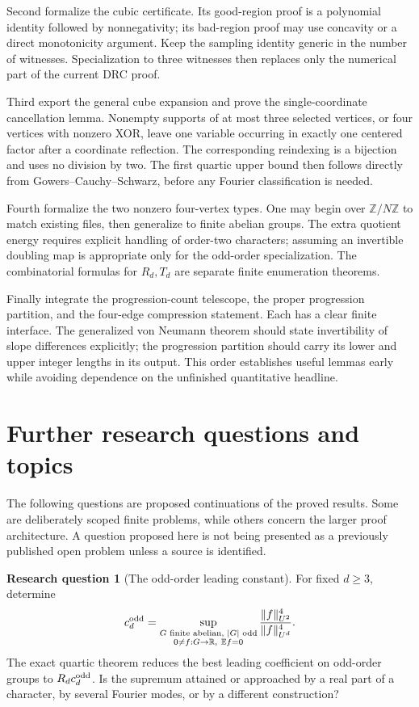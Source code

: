 \documentclass[11pt,letterpaper]{article}
\numberwithin{equation}{section}
\theoremstyle{definition}
\newtheorem{problem}[theorem]{Research question}
\theoremstyle{remark}
\newcommand{\E}{\mathbb E}
\newcommand{\R}{\mathbb R}
\newcommand{\Z}{\mathbb Z}
\newcommand{\1}{\mathbf 1}
\newcommand{\srctag}[1]{\texorpdfstring{\enspace\textup{[#1]}}{ [#1]}}
\newcommand{\srcnote}[2]{\par\noindent{\small\textit{Source #1, delivered #2.}}\par}
\begin{document}
Second formalize the cubic certificate. Its good-region proof is a
polynomial identity followed by nonnegativity; its bad-region proof may
use concavity or a direct monotonicity argument. Keep the sampling
identity generic in the number of witnesses. Specialization to three
witnesses then replaces only the numerical part of the current DRC
proof.

Third export the general cube expansion and prove the single-coordinate
cancellation lemma. Nonempty supports of at most three selected vertices, or four vertices
with nonzero XOR, leave one variable occurring in exactly one centered
factor after a coordinate reflection. The corresponding reindexing is
a bijection and uses no division by two. The first quartic upper bound
then follows directly from Gowers--Cauchy--Schwarz, before any Fourier
classification is needed.

Fourth formalize the two nonzero four-vertex types. One may begin over
$\Z/N\Z$ to match existing files, then generalize to finite abelian
groups. The extra quotient energy requires explicit handling of order-two
characters; assuming an invertible doubling map is appropriate only for
the odd-order specialization. The combinatorial formulas for $R_d,T_d$
are separate finite enumeration theorems.

Finally integrate the progression-count telescope, the proper progression
partition, and the four-edge compression statement. Each has a clear
finite interface. The generalized von Neumann theorem should state
invertibility of slope differences explicitly; the progression partition
should carry its lower and upper integer lengths in its output. This
order establishes useful lemmas early while avoiding dependence on the
unfinished quantitative headline.

\section[{Further research questions and topics\srctag{03}}]{Further research questions and topics}\label{gsr:fz:03:sec:d11}
\srcnote{03}{Section 11}
\label{gsr:fz:03:sec:research}

The following questions are proposed continuations of the proved results.
Some are deliberately scoped finite problems, while others concern the
larger proof architecture. A question proposed here is not being presented
as a previously published open problem unless a source is identified.

\begin{problem}[The odd-order leading constant]
\label{gsr:fz:03:question:oddconstant}
For fixed $d\ge3$, determine
\[
 c_d^{\rm odd}=\sup_{\substack{G\text{ finite abelian, }|G|\text{ odd}\\
                     0\ne f:G\to\R,\ \E f=0}}
       \frac{\|f\|_{U^2}^4}{\|f\|_{U^d}^4}.
\]
The exact quartic theorem reduces the best leading coefficient on
odd-order groups to $R_dc_d^{\rm odd}$. Is the supremum attained or
approached by a real part of a character, by several Fourier modes, or
by a different construction?
\end{problem}
\end{document}
